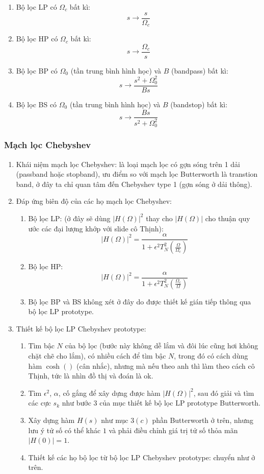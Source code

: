 \documentclass{article}
\begin{document}
\begin{enumerate}
    \begin{enumerate}
      \item Bộ lọc LP có $\Omega_{c}$ bất kì: $$s\to \frac{s}{\Omega_{c}}$$
      \item Bộ lọc HP có $\Omega_{c}$ bất kì: $$s\to \frac{\Omega_{c}}{s}$$
      \item Bộ lọc BP có $\Omega_{0}$ (tần trung bình hình học) và $B$ (bandpass) bất kì: $$s\to \frac{s^2+\Omega_{0}^2}{Bs}$$
      \item Bộ lọc BS có $\Omega_{0}$ (tần trung bình hình học) và $B$ (bandstop) bất kì: $$s\to \frac{Bs}{s^2+\Omega_{0}^2}$$
    \end{enumerate}
\end{enumerate}
\subsubsection{Mạch lọc Chebyshev}
\begin{enumerate}
  \item Khái niệm mạch lọc Chebyshev: là loại mạch lọc có gợn sóng trên 1 dải (passband hoặc stopband), ưu điểm so với mạch lọc Butterworth là transtion band, ở đây ta chỉ quan tâm đến
  Chebyshev type 1 (gợn sóng ở dải thông).
  \item Đáp ứng biên độ của các họ mạch lọc Chebyshev:
  \begin{enumerate}
    \item Bộ lọc LP: (ở đây sẽ dùng $|H(\Omega)|^2$ thay cho $|H(\Omega)|$ cho thuận quy ước các đại lượng khớp với slide cô Thịnh):
    $$|H(\Omega)|^{2}=\frac{\alpha}{1+\epsilon^2T_{N}^2\left(\frac{\Omega}{\Omega_{c}}\right)}$$
    \item Bộ lọc HP:
    $$|H(\Omega)|^{2}=\frac{\alpha}{1+\epsilon^2T_{N}^2\left(\frac{\Omega_{c}}{\Omega}\right)}$$
    \item Bộ lọc BP và BS không xét ở đây do được thiết kế gián tiếp thông qua bộ lọc LP prototype.
  \end{enumerate}
  \item Thiết kế bộ lọc LP Chebyshev prototype:
    \begin{enumerate}
      \item Tìm bậc $N$ của bộ lọc (bước này không dễ lắm và đôi lúc cũng hơi không chặt chẽ cho lắm), có nhiều cách để tìm bậc $N$, trong đó có cách dùng hàm $\cosh()$ (cân nhắc), nhưng mà nếu theo anh thì làm theo cách cô Thịnh, tức là nhìn đồ thị và đoán là ok.
      \item Tìm $\epsilon^2$, $\alpha$, cố gắng để xây dựng được hàm $|H(\Omega)|^2$, sau đó giải và tìm các cực $s_{k}$ như bước $3$ của mục thiết kế bộ lọc LP prototype Butterworth.
      \item Xây dựng hàm $H(s)$ như mục $3(c)$ phần Butterworth ở trên, nhưng lưu ý tử số có thể khác $1$ và phải điều chỉnh giá trị tử số thỏa mãn $|H(0)|=1$.
      \item Thiết kế các họ bộ lọc từ bộ lọc LP Chebyshev prototype: chuyển như ở trên.
    \end{enumerate}
\end{enumerate}
\end{document}
